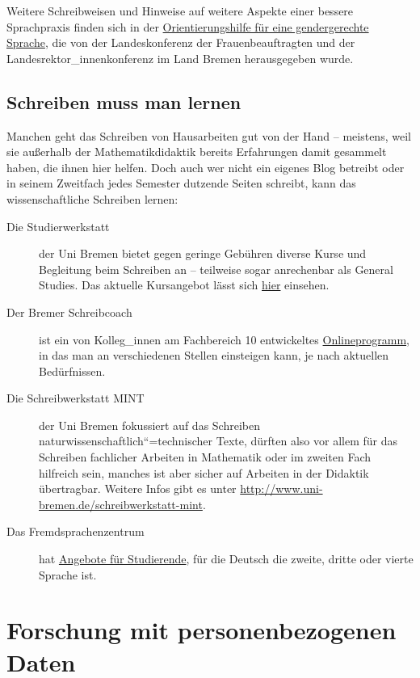 \documentclass[ngerman,bibliography=totoc,oneside,12pt,a4paper]{scrbook}
\begin{document}
Weitere Schreibweisen und Hinweise auf weitere Aspekte einer bessere
Sprachpraxis finden sich in der
\href{https://www.uni-bremen.de/fileadmin/user_upload/sites/zentrale-frauenbeauftragte/UfHuql-OrientierungshilfeFuerGendergerechteSprache.pdf}{Orientierungshilfe
für eine gendergerechte Sprache}, die von der Landeskonferenz der
Frauenbeauftragten und der Landesrektor\_innenkonferenz im Land Bremen
herausgegeben wurde.

\section{Schreiben muss man lernen}\label{schreiben-muss-man-lernen}

Manchen geht das Schreiben von Hausarbeiten gut von der Hand --
meistens, weil sie außerhalb der Mathematikdidaktik bereits Erfahrungen
damit gesammelt haben, die ihnen hier helfen. Doch auch wer nicht ein
eigenes Blog betreibt oder in seinem Zweitfach jedes Semester dutzende
Seiten schreibt, kann das wissenschaftliche Schreiben lernen:

\begin{description}
\item[Die Studierwerkstatt]
der Uni Bremen bietet gegen geringe Gebühren diverse Kurse und
Begleitung beim Schreiben an -- teilweise sogar anrechenbar als General
Studies. Das aktuelle Kursangebot lässt sich
\href{https://www.uni-bremen.de/studierwerkstatt/programm/}{hier}
einsehen.
\item[Der Bremer Schreibcoach]
ist ein von Kolleg\_innen am Fachbereich 10 entwickeltes
\href{http://www.bremer-schreibcoach.uni-bremen.de/}{Onlineprogramm}, in
das man an verschiedenen Stellen einsteigen kann, je nach aktuellen
Bedürfnissen.
\item[Die Schreibwerkstatt MINT]
der Uni Bremen fokussiert auf das Schreiben
naturwissenschaftlich``=technischer Texte, dürften also vor allem für
das Schreiben fachlicher Arbeiten in Mathematik oder im zweiten Fach
hilfreich sein, manches ist aber sicher auf Arbeiten in der Didaktik
übertragbar. Weitere Infos gibt es unter
\url{http://www.uni-bremen.de/schreibwerkstatt-mint}.
\item[Das Fremdsprachenzentrum]
hat \href{http://www.fremdsprachenzentrum-bremen.de}{Angebote für
Studierende}, für die Deutsch die zweite, dritte oder vierte Sprache
ist.
\end{description}

\chapter{Forschung mit personenbezogenen
Daten}\label{forschung-mit-personenbezogenen-daten}
\end{document}
